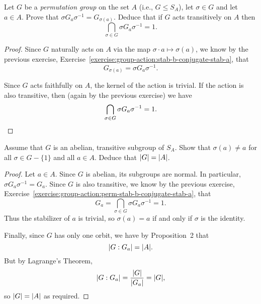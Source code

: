 \label{exercise:group-action:perm-stab-b-conjugate-stab-a}
Let $G$ be a {\em permutation group} on the set $A$ (i.e.,
$G\leq S_A$), let $\sigma\in G$ and let $a\in A$. Prove that
$\sigma G_a\sigma^{-1} = G_{\sigma(a)}$. Deduce that if $G$ acts
transitively on $A$ then
\begin{equation*}
  \bigcap_{\sigma\in G}\sigma G_a\sigma^{-1} = 1.
\end{equation*}
\begin{proof}
  Since $G$ naturally acts on $A$ via the map
  $\sigma\cdot a\mapsto\sigma(a)$, we know by the previous exercise,
  Exercise~\ref{exercise:group-action:stab-b-conjugate-stab-a}, that
  \begin{equation*}
    G_{\sigma(a)} = \sigma G_a\sigma^{-1}.
  \end{equation*}

  Since $G$ acts faithfully on $A$, the kernel of the action is
  trivial. If the action is also transitive, then (again by the
  previous exercise) we have
  \begin{equation*}
    \bigcap_{\sigma\in G}\sigma G_a\sigma^{-1} = 1. \qedhere
  \end{equation*}
\end{proof}

 Assume that $G$ is an abelian, transitive subgroup of
$S_A$. Show that $\sigma(a) \neq a$ for all $\sigma\in G - \{1\}$ and
all $a\in A$. Deduce that $\lvert{G}\rvert = \lvert{A}\rvert$.
\begin{proof}
  Let $a\in A$. Since $G$ is abelian, its subgroups are normal. In
  particular, $\sigma G_a\sigma^{-1} = G_a$. Since $G$ is also
  transitive, we know by the previous exercise,
  Exercise~\ref{exercise:group-action:perm-stab-b-conjugate-stab-a},
  that
  \begin{equation*}
    G_a = \bigcap_{\sigma\in G}\sigma G_a\sigma^{-1} = 1.
  \end{equation*}
  Thus the stabilizer of $a$ is trivial, so $\sigma(a) = a$ if and
  only if $\sigma$ is the identity.

  Finally, since $G$ has only one orbit, we have by Proposition~2 that
  \begin{equation*}
    \lvert{G : G_a}\rvert = \lvert{A}\rvert.
  \end{equation*}
  But by Lagrange's Theorem,
  \begin{equation*}
    \lvert{G : G_a}\rvert = \frac{\lvert{G}\rvert}{\lvert{G_a}\rvert} = \lvert{G}\rvert,
  \end{equation*}
  so $\lvert{G}\rvert = \lvert{A}\rvert$ as required.
\end{proof}

